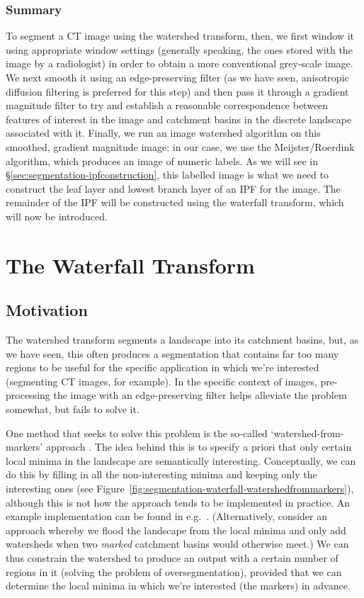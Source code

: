 \subsubsection{Summary}

To segment a CT image using the watershed transform, then, we first window it using appropriate window settings (generally speaking, the ones stored with the image by a radiologist) in order to obtain a more conventional grey-scale image. We next smooth it using an edge-preserving filter (as we have seen, anisotropic diffusion filtering is preferred for this step) and then pass it through a gradient magnitude filter to try and establish a reasonable correspondence between features of interest in the image and catchment basins in the discrete landscape associated with it. Finally, we run an image watershed algorithm on this smoothed, gradient magnitude image: in our case, we use the Meijster/Roerdink algorithm, which produces an image of numeric labels. As we will see in \S\ref{sec:segmentation-ipfconstruction}, this labelled image is what we need to construct the leaf layer and lowest branch layer of an IPF for the image. The remainder of the IPF will be constructed using the waterfall transform, which will now be introduced.

\clearpage

\section{The Waterfall Transform}

\subsection{Motivation}

The watershed transform segments a landscape into its catchment basins, but, as we have seen, this often produces a segmentation that contains far too many regions to be useful for the specific application in which we're interested (segmenting CT images, for example). In the specific context of images, pre-processing the image with an edge-preserving filter helps alleviate the problem somewhat, but fails to solve it.

One method that seeks to solve this problem is the so-called `watershed-from-markers' approach \cite{meyer90}. The idea behind this is to specify a priori that only certain local minima in the landscape are semantically interesting. Conceptually, we can do this by filling in all the non-interesting minima and keeping only the interesting ones (see Figure~\ref{fig:segmentation-waterfall-watershedfrommarkers}), although this is not how the approach tends to be implemented in practice. An example implementation can be found in e.g.~\cite{felkel01}. (Alternatively, consider an approach whereby we flood the landscape from the local minima and only add watersheds when two \emph{marked} catchment basins would otherwise meet.) We can thus constrain the watershed to produce an output with a certain number of regions in it (solving the problem of oversegmentation), provided that we can determine the local minima in which we're interested (the markers) in advance.

